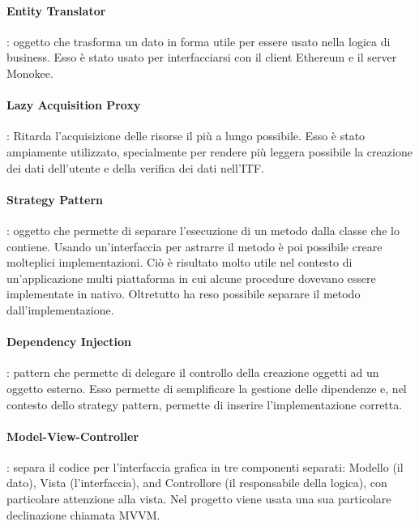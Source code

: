 \paragraph{Entity Translator}: oggetto che trasforma un dato in forma utile per essere usato nella logica di business. Esso è stato usato per interfacciarsi con il client Ethereum e il server Monokee.

\paragraph{Lazy Acquisition Proxy}: Ritarda l’acquisizione delle risorse il più a lungo possibile. Esso è stato ampiamente utilizzato, specialmente per rendere più leggera possibile la creazione dei dati dell’utente e della verifica dei dati nell’ITF.

\paragraph{Strategy Pattern}: oggetto che permette di separare l’esecuzione di un metodo dalla classe che lo contiene. Usando un’interfaccia per astrarre il metodo è poi possibile creare molteplici implementazioni. Ciò è risultato molto utile nel contesto di un’applicazione multi piattaforma in cui alcune procedure dovevano essere implementate in nativo. Oltretutto ha reso possibile separare il metodo dall’implementazione.

\paragraph{Dependency Injection}: pattern che permette di delegare il controllo della creazione oggetti ad un oggetto esterno. Esso permette di semplificare la gestione delle dipendenze e, nel contesto dello strategy pattern, permette di inserire l’implementazione corretta.

\paragraph{Model-View-Controller}: separa il codice per l’interfaccia grafica in tre componenti separati: Modello (il dato), Vista (l’interfaccia), and Controllore (il responsabile della logica), con particolare attenzione alla vista. Nel progetto viene usata una sua particolare declinazione chiamata MVVM. 



\newpage
